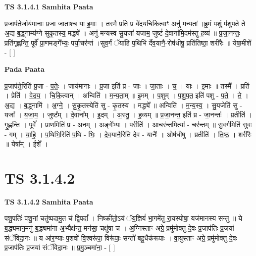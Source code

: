 \documentclass[17pt]{extarticle}
\begin{document}
\textbf{TS 3.1.4.1 } \newline
\textbf{Samhita Paata} \newline

प्र॒जाप॑ते॒र्जाय॑मानाः प्र॒जा जा॒ताश्च॒ या इ॒माः । तस्मै॒ प्रति॒ प्र वे॑दयचिकि॒त्वाꣳ अनु॑ मन्यतां ॥इ॒मं प॒शुं प॑शुपते ते अ॒द्य ब॒द्ध्नाम्य॑ग्ने सुकृ॒तस्य॒ मद्ध्ये᳚ । अनु॑ मन्यस्व सु॒यजा॑ यजाम॒ जुष्टं॑ दे॒वाना॑मि॒दम॑स्तु ह॒व्यं ॥ प्र॒जा॒नन्तः॒ प्रति॑गृह्णन्ति॒ पूर्वे᳚ प्रा॒णमङ्गे᳚भ्यः॒ पर्या॒चर॑न्तं ।सुव॒र्गं ॅया॑हि प॒थिभि॑ र्देव॒यानै॒-रोष॑धीषु॒ प्रति॑तिष्ठा॒ शरी॑रैः ॥ येषा॒मीशे॑ - [  ] \newline

\textbf{Pada Paata} \newline

प्र॒जाप॑ते॒रिति॑ प्र॒जा - प॒तेः॒ । जाय॑मानाः । प्र॒जा इति॑ प्र - जाः । जा॒ताः । च॒ । याः । इ॒माः ॥ तस्मै᳚ । प्रति॑ । प्रेति॑ । वे॒द॒य॒ । चि॒कि॒त्वान् । अन्विति॑ । म॒न्य॒ता॒म् ॥ इ॒मम् । प॒शुम् । प॒शु॒प॒त॒ इति॑ पशु - प॒ते॒ । ते॒ । अ॒द्य । ब॒द्ध्नामि॑ । अ॒ग्ने॒ । सु॒कृ॒तस्येति॑ सु - कृ॒तस्य॑ । मद्ध्ये᳚ ॥ अन्विति॑ । म॒न्य॒स्व॒ । सु॒यजेति॑ सु - यजा᳚ । य॒जा॒म॒ । जुष्ट᳚म् । दे॒वाना᳚म् । इ॒दम् । अ॒स्तु॒ । ह॒व्यम् ॥ प्र॒जा॒नन्त॒ इति॑ प्र - जा॒नन्तः॑ । प्रतीति॑ । गृ॒ह्ण॒न्ति॒ । पूर्वे᳚ । प्रा॒णमिति॑ प्र - अ॒नम् । अङ्गे᳚भ्यः । परीति॑ । आ॒चर॑न्त॒मित्या᳚ - चर॑न्तम् ॥ सु॒व॒र्गमिति॑ सुवः - गम् । या॒हि॒ । प॒थिभि॒रिति॑ प॒थि - भिः॒ । दे॒व॒यानै॒रिति॑ देव - यानैः᳚ । ओष॑धीषु । प्रतीति॑ । ति॒ष्ठ॒ । शरी॑रैः ॥ येषा᳚म् । ईशे᳚ ।  \newline




\section*{ TS 3.1.4.2 }

\textbf{TS 3.1.4.2 } \newline
\textbf{Samhita Paata} \newline

पशु॒पतिः॑ पशू॒नां चतु॑ष्पदामु॒त च॑ द्वि॒पदां᳚ । निष्क्री॑तो॒ऽयं ॅय॒ज्ञियं॑ भा॒गमे॑तु रा॒यस्पोषा॒ यज॑मानस्य सन्तु ॥ ये ब॒द्ध्यमा॑न॒मनु॑ ब॒द्ध्यमा॑ना अ॒भ्यैक्ष॑न्त॒ मन॑सा॒ चक्षु॑षा च । अ॒ग्निस्ताꣳ अग्रे॒ प्रमु॑मोक्तु दे॒वः प्र॒जाप॑तिः प्र॒जया॑ संॅविदा॒नः ॥ य आ॑र॒ण्याः प॒शवो॑ वि॒श्वरू॑पा॒ विरू॑पाः॒ सन्तो॑ बहु॒धैक॑रूपाः । वा॒युस्ताꣳ अग्रे॒ प्रमु॑मोक्तु दे॒वः प्र॒जाप॑तिः प्र॒जया॑ संॅविदा॒नः ॥ प्र॒मु॒ञ्चमा॑ना॒ - [  ] \newline
\end{document}
